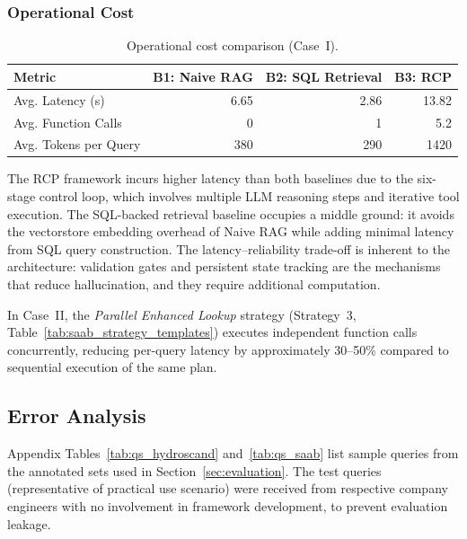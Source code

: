 \documentclass[largeformat]{interact}
\begin{document}
\subsubsection{Operational Cost}
\label{subsubsec:operational_cost}

\begin{table}[h]
    \centering
    \caption{Operational cost comparison (Case~I).}
    \label{tab:operational_cost}
    \small
    \setlength{\tabcolsep}{8pt}
    \renewcommand{\arraystretch}{1.1}
    \begin{tabular}{@{}lrrr@{}}
        \toprule
        \textbf{Metric} & \textbf{B1: Naive RAG} & \textbf{B2: SQL Retrieval} & \textbf{B3: RCP} \\
        \midrule
        Avg. Latency (s)      & 6.65  & 2.86  & 13.82  \\
        Avg. Function Calls   & 0   & 1 & 5.2  \\
        Avg. Tokens per Query & 380  & 290   & 1420  \\
        \bottomrule
    \end{tabular}
\end{table}

The RCP framework incurs higher latency than both baselines due to the six-stage control loop, which involves multiple LLM reasoning steps and iterative tool execution. The SQL-backed retrieval baseline occupies a middle ground: it avoids the vectorstore embedding overhead of Naive RAG while adding minimal latency from SQL query construction. The latency--reliability trade-off is inherent to the architecture: validation gates and persistent state tracking are the mechanisms that reduce hallucination, and they require additional computation.

In Case~II, the \emph{Parallel Enhanced Lookup} strategy (Strategy~3, Table~\ref{tab:saab_strategy_templates}) executes independent function calls concurrently, reducing per-query latency by approximately 30--50\% compared to sequential execution of the same plan.

\subsection{Error Analysis}
\label{subsec:error_analysis}
Appendix Tables~\ref{tab:qs_hydroscand} and~\ref{tab:qs_saab}  list sample queries from the annotated sets used in Section~\ref{sec:evaluation}. The test queries (representative of practical use scenario) were received from respective company engineers with no involvement in framework development, to prevent evaluation leakage. 
\end{document}
